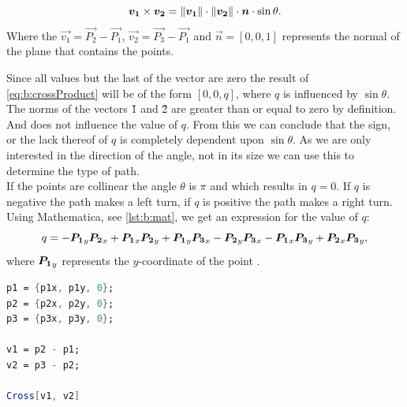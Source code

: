 \begin{equation}\label{eq:b:crossProduct}
	\boldsymbol{v_1} \times \boldsymbol{v_2} = 
	\lVert\boldsymbol{v_1}\rVert \cdot \lVert\boldsymbol{v_2}\rVert \cdot \boldsymbol{n} \cdot \sin \theta.
\end{equation}
Where the $\vec{v_1} = \vec{P_2} - \vec{P_1}$, $\vec{v_2} = \vec{P_3} - \vec{P_1}$ and $\vec{n} = [0, 0, 1]$ represents the normal of the plane that contains the points. 

Since all values but the last of the vector  are zero the result of \eqref{eq:b:crossProduct} will be of the form $[0, 0, q]$, where $q$ is influenced by $\sin \theta$. The norms of the vectors \v{1} and \v{2} are greater than or equal to zero by definition. And does not influence the value of $q$. From this we can conclude that the sign, or the lack thereof of $q$ is completely dependent upon $\sin \theta$. As we are only interested in the direction of the angle, not in its size we can use this to determine the type of path.\\

If the points are collinear the angle $\theta$ is $\pi$ and which results in $q = 0$. If $q$ is negative the path makes a left turn, if $q$ is positive the path makes a right turn.\\

Using Mathematica, see \autoref{lst:b:mat}, we get an expression for the value of $q$:
\begin{equation}
	q = -\boldsymbol{P_1}_y \boldsymbol{P_2}_x + \boldsymbol{P_1}_x \boldsymbol{P_2}_y + \boldsymbol{P_1}_y \boldsymbol{P_3}_x - \boldsymbol{P_2}_y \boldsymbol{P_3}_x - \boldsymbol{P_1}_x \boldsymbol{P_3}_y + \boldsymbol{P_2}_x \boldsymbol{P_3}_y,
\end{equation}
where $\boldsymbol{P_1}_y$ represents the $y$-coordinate of the point .

\begin{lstlisting}[float, language=Mathematica, label={lst:b:mat}, caption={Mathematica code used to compute the value of $q$.}]
p1 = {p1x, p1y, 0};
p2 = {p2x, p2y, 0};
p3 = {p3x, p3y, 0};

v1 = p2 - p1;
v2 = p3 - p2;

Cross[v1, v2]	
\end{lstlisting}


